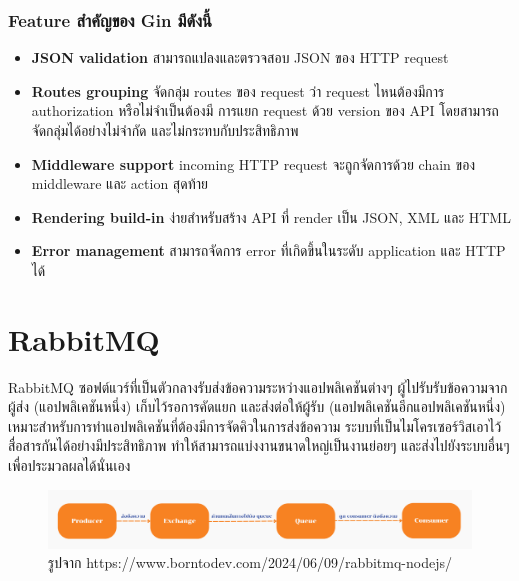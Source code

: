 \subsubsection{Feature สำคัญของ Gin มีดังนี้ }
\begin{itemize}
  \item \textbf{JSON validation} สามารถแปลงและตรวจสอบ JSON ของ HTTP request
  \item \textbf{Routes grouping} จัดกลุ่ม routes ของ request ว่า request ไหนต้องมีการ authorization หรือไม่จำเป็นต้องมี การแยก request ด้วย version ของ API โดยสามารถจัดกลุ่มได้อย่างไม่จำกัด และไม่กระทบกับประสิทธิภาพ
  \item \textbf{Middleware support} incoming HTTP request จะถูกจัดการด้วย chain ของ middleware และ action สุดท้าย
  \item \textbf{Rendering build-in} ง่ายสำหรับสร้าง API ที่ render เป็น JSON, XML และ HTML
  \item \textbf{Error management} สามารถจัดการ error ที่เกิดขึ้นในระดับ application และ HTTP ได้
\end{itemize}

\section{RabbitMQ}
\hspace{1.27cm}RabbitMQ \cite{rabbitmq}ซอฟต์แวร์ที่เป็นตัวกลางรับส่งข้อความระหว่างแอปพลิเคชันต่างๆ ผู้ไปรับรับข้อความจากผู้ส่ง (แอปพลิเคชันหนึ่ง) เก็บไว้รอการคัดแยก และส่งต่อให้ผู้รับ (แอปพลิเคชันอีกแอปพลิเคชันหนึ่ง) เหมาะสำหรับการทำแอปพลิเคชันที่ต้องมีการจัดคิวในการส่งข้อความ ระบบที่เป็นไมโครเซอร์วิสเอาไว้สื่อสารกันได้อย่างมีประสิทธิภาพ ทำให้สามารถแบ่งงานขนาดใหญ่เป็นงานย่อยๆ และส่งไปยังระบบอื่นๆ เพื่อประมวลผลได้นั่นเอง
\begin{figure}[H] %
    \centering
    \includegraphics[width=\linewidth, keepaspectratio]{pictures/rabbitmq.png}
    \caption[Poem]{รูปจาก https://www.borntodev.com/2024/06/09/rabbitmq-nodejs/}
    \label{fig:rabbitmq}
\end{figure}

